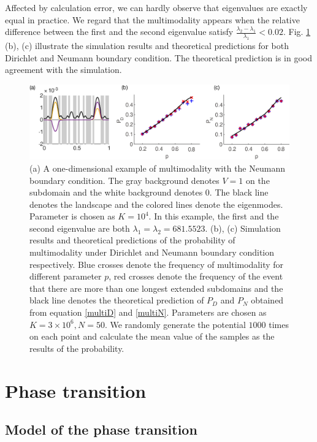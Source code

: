 \documentclass[a4paper,11pt]{article}
\begin{document}
Affected by calculation error, we can hardly observe that eigenvalues are exactly equal in practice. We regard that the multimodality appears when the relative difference between the first and the second eigenvalue satisfy $\frac{\lambda_2 - \lambda_1}{\lambda_1} < 0.02$. Fig. \ref{fig4} (b), (c) illustrate the simulation results and theoretical predictions for both Dirichlet and Neumann boundary condition. The theoretical prediction is in good agreement with the simulation.

\begin{figure}
\centering
\includegraphics[width=\linewidth]{Fig4.eps}
\caption{(a) A one-dimensional example of multimodality with the Neumann boundary condition. The gray background denotes $V = 1$ on the subdomain and the white background denotes $0$. The black line denotes the landscape and the colored lines denote the eigenmodes.  Parameter is chosen as $K = 10^4$. In this example, the first and the second eigenvalue are both $\lambda_1 = \lambda_2 = 681.5523$. (b), (c) Simulation results and theoretical predictions of the probability of multimodality under Dirichlet and Neumann boundary condition respectively. Blue crosses denote the frequency of multimodality for different parameter $p$, red crosses denote the frequency of the event that there are more than one longest extended subdomains and the black line denotes the theoretical prediction of $P_D$ and $P_N$ obtained from equation \eqref{multiD} and \eqref{multiN}. Parameters are chosen as $K = 3 \times 10^6, N = 50$. We randomly generate the potential $1000$ times on each point and calculate the mean value of the samples as the results of the probability.}
\label{fig4}
\end{figure}

\section{Phase transition}\label{phase}

\subsection{Model of the phase transition}
\end{document}
